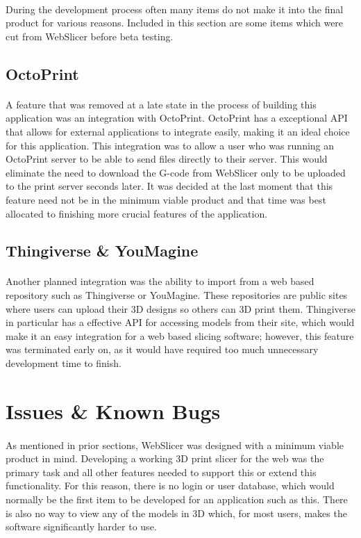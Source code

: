 \paragraph{}
During the development process often many items do not make it into the final product for various reasons.
Included in this section are some items which were cut from WebSlicer before beta testing.

\subsection{OctoPrint}
\paragraph{}
A feature that was removed at a late state in the process of building this application was an integration with OctoPrint.
OctoPrint has a exceptional API that allows for external applications to integrate easily, making it an ideal choice for this application.
This integration was to allow a user who was running an OctoPrint server to be able to send files directly to their server.
This would eliminate the need to download the G-code from WebSlicer only to be uploaded to the print server seconds later.
It was decided at the last moment that this feature need not be in the minimum viable product and that time was best allocated to finishing more crucial features of the application.

\subsection{Thingiverse \& YouMagine}
\paragraph{}
Another planned integration was the ability to import from a web based repository such as Thingiverse or YouMagine.
These repositories are public sites where users can upload their 3D designs so others can 3D print them.
Thingiverse in particular has a effective API for accessing models from their site, which would make it an easy integration for a web based slicing software;
however, this feature was terminated early on, as it would have required too much unnecessary development time to finish.

\section{Issues \& Known Bugs}
\paragraph{}
As mentioned in prior sections, WebSlicer was designed with a minimum viable product in mind.
Developing a working 3D print slicer for the web was the primary task and all other features needed to support this or extend this functionality.
For this reason, there is no login or user database, which would normally be the first item to be developed for an application such as this.
There is also no way to view any of the models in 3D which, for most users, makes the software significantly harder to use.

